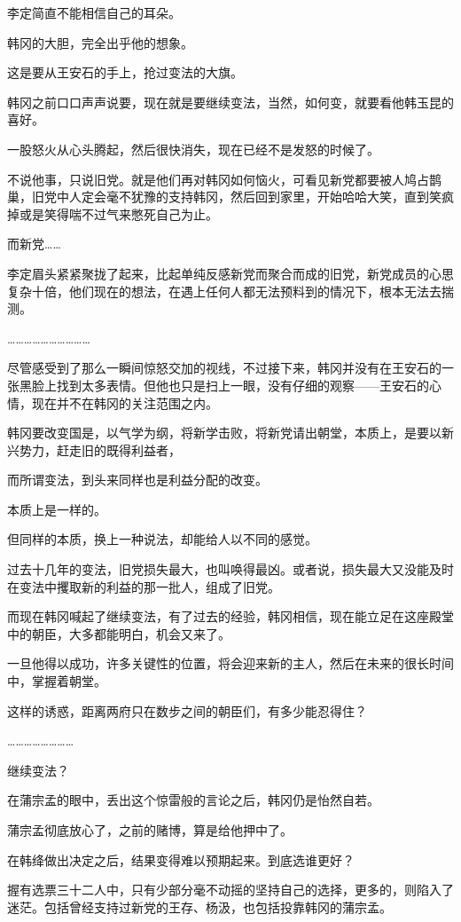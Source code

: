 李定简直不能相信自己的耳朵。

韩冈的大胆，完全出乎他的想象。

这是要从王安石的手上，抢过变法的大旗。

韩冈之前口口声声说要，现在就是要继续变法，当然，如何变，就要看他韩玉昆的喜好。

一股怒火从心头腾起，然后很快消失，现在已经不是发怒的时候了。

不说他事，只说旧党。就是他们再对韩冈如何恼火，可看见新党都要被人鸠占鹊巢，旧党中人定会毫不犹豫的支持韩冈，然后回到家里，开始哈哈大笑，直到笑疯掉或是笑得喘不过气来憋死自己为止。

而新党……

李定眉头紧紧聚拢了起来，比起单纯反感新党而聚合而成的旧党，新党成员的心思复杂十倍，他们现在的想法，在遇上任何人都无法预料到的情况下，根本无法去揣测。

…………………………

尽管感受到了那么一瞬间惊怒交加的视线，不过接下来，韩冈并没有在王安石的一张黑脸上找到太多表情。但他也只是扫上一眼，没有仔细的观察——王安石的心情，现在并不在韩冈的关注范围之内。

韩冈要改变国是，以气学为纲，将新学击败，将新党请出朝堂，本质上，是要以新兴势力，赶走旧的既得利益者，

而所谓变法，到头来同样也是利益分配的改变。

本质上是一样的。

但同样的本质，换上一种说法，却能给人以不同的感觉。

过去十几年的变法，旧党损失最大，也叫唤得最凶。或者说，损失最大又没能及时在变法中攫取新的利益的那一批人，组成了旧党。

而现在韩冈喊起了继续变法，有了过去的经验，韩冈相信，现在能立足在这座殿堂中的朝臣，大多都能明白，机会又来了。

一旦他得以成功，许多关键性的位置，将会迎来新的主人，然后在未来的很长时间中，掌握着朝堂。

这样的诱惑，距离两府只在数步之间的朝臣们，有多少能忍得住？

……………………

继续变法？

在蒲宗孟的眼中，丢出这个惊雷般的言论之后，韩冈仍是怡然自若。

蒲宗孟彻底放心了，之前的赌博，算是给他押中了。

在韩绛做出决定之后，结果变得难以预期起来。到底选谁更好？

握有选票三十二人中，只有少部分毫不动摇的坚持自己的选择，更多的，则陷入了迷茫。包括曾经支持过新党的王存、杨汲，也包括投靠韩冈的蒲宗孟。

